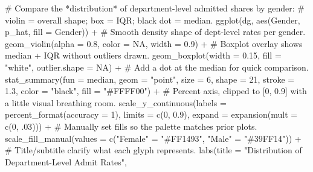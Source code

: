 \documentclass[
  letterpaper,
  DIV=11,
  numbers=noendperiod]{scrreprt}
\newenvironment{Shaded}{\begin{snugshade}}{\end{snugshade}}
\newcommand{\AttributeTok}[1]{\textcolor[rgb]{0.40,0.45,0.13}{#1}}
\newcommand{\CommentTok}[1]{\textcolor[rgb]{0.37,0.37,0.37}{#1}}
\newcommand{\ConstantTok}[1]{\textcolor[rgb]{0.56,0.35,0.01}{#1}}
\newcommand{\DecValTok}[1]{\textcolor[rgb]{0.68,0.00,0.00}{#1}}
\newcommand{\FloatTok}[1]{\textcolor[rgb]{0.68,0.00,0.00}{#1}}
\newcommand{\FunctionTok}[1]{\textcolor[rgb]{0.28,0.35,0.67}{#1}}
\newcommand{\NormalTok}[1]{\textcolor[rgb]{0.00,0.23,0.31}{#1}}
\newcommand{\OtherTok}[1]{\textcolor[rgb]{0.00,0.23,0.31}{#1}}
\newcommand{\SpecialCharTok}[1]{\textcolor[rgb]{0.37,0.37,0.37}{#1}}
\newcommand{\StringTok}[1]{\textcolor[rgb]{0.13,0.47,0.30}{#1}}
\begin{document}
\begin{Shaded}
\begin{Highlighting}[]
\CommentTok{\# Compare the *distribution* of department{-}level admitted shares by gender:}
\CommentTok{\# violin = overall shape; box = IQR; black dot = median.}
\FunctionTok{ggplot}\NormalTok{(dg, }\FunctionTok{aes}\NormalTok{(Gender, p\_hat, }\AttributeTok{fill =}\NormalTok{ Gender)) }\SpecialCharTok{+}
  \CommentTok{\# Smooth density shape of dept{-}level rates per gender.}
  \FunctionTok{geom\_violin}\NormalTok{(}\AttributeTok{alpha =} \FloatTok{0.8}\NormalTok{, }\AttributeTok{color =} \ConstantTok{NA}\NormalTok{, }\AttributeTok{width =} \FloatTok{0.9}\NormalTok{) }\SpecialCharTok{+}
  \CommentTok{\# Boxplot overlay shows median + IQR without outliers drawn.}
  \FunctionTok{geom\_boxplot}\NormalTok{(}\AttributeTok{width =} \FloatTok{0.15}\NormalTok{, }\AttributeTok{fill =} \StringTok{"white"}\NormalTok{, }\AttributeTok{outlier.shape =} \ConstantTok{NA}\NormalTok{) }\SpecialCharTok{+}
  \CommentTok{\# Add a dot at the median for quick comparison.}
   \FunctionTok{stat\_summary}\NormalTok{(}\AttributeTok{fun =}\NormalTok{ median, }\AttributeTok{geom =} \StringTok{"point"}\NormalTok{, }\AttributeTok{size =} \DecValTok{6}\NormalTok{,}
               \AttributeTok{shape =} \DecValTok{21}\NormalTok{, }\AttributeTok{stroke =} \FloatTok{1.3}\NormalTok{, }\AttributeTok{color =} \StringTok{"black"}\NormalTok{,}
               \AttributeTok{fill =} \StringTok{"\#FFFF00"}\NormalTok{) }\SpecialCharTok{+}
  \CommentTok{\# Percent axis, clipped to [0, 0.9] with a little visual breathing room.}
  \FunctionTok{scale\_y\_continuous}\NormalTok{(}\AttributeTok{labels =} \FunctionTok{percent\_format}\NormalTok{(}\AttributeTok{accuracy =} \DecValTok{1}\NormalTok{),}
                     \AttributeTok{limits =} \FunctionTok{c}\NormalTok{(}\DecValTok{0}\NormalTok{, }\FloatTok{0.9}\NormalTok{),}
                     \AttributeTok{expand =} \FunctionTok{expansion}\NormalTok{(}\AttributeTok{mult =} \FunctionTok{c}\NormalTok{(}\DecValTok{0}\NormalTok{, .}\DecValTok{03}\NormalTok{))) }\SpecialCharTok{+}
  \CommentTok{\# Manually set fills so the palette matches prior plots.}
  \FunctionTok{scale\_fill\_manual}\NormalTok{(}\AttributeTok{values =} \FunctionTok{c}\NormalTok{(}\StringTok{"Female"} \OtherTok{=} \StringTok{"\#FF1493"}\NormalTok{, }\StringTok{"Male"} \OtherTok{=} \StringTok{"\#39FF14"}\NormalTok{)) }\SpecialCharTok{+}
  \CommentTok{\# Title/subtitle clarify what each glyph represents.}
  \FunctionTok{labs}\NormalTok{(}\AttributeTok{title =} \StringTok{"Distribution of Department{-}Level Admit Rates"}\NormalTok{,}

\end{Highlighting}
\end{Shaded}
\end{document}
